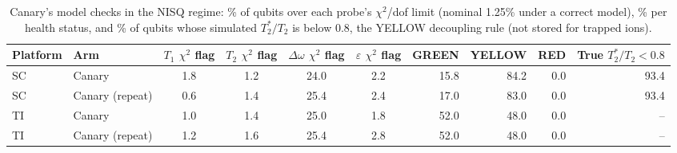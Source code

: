 \begin{table}[!t]
\centering
\footnotesize
\caption{Canary's model checks in the NISQ regime: \% of qubits over each probe's $\chi^2$/dof limit (nominal 1.25\% under a correct model), \% per health status, and \% of qubits whose simulated $T_2^*/T_2$ is below 0.8, the YELLOW decoupling rule (not stored for trapped ions).}
\label{tab:s4}
\begin{adjustbox}{max width=\linewidth}
\begin{tabular}{llccccrrrr}
\hline
Platform & Arm & $T_1$ $\chi^2$ flag & $T_2$ $\chi^2$ flag & $\Delta\omega$ $\chi^2$ flag & $\varepsilon$ $\chi^2$ flag & GREEN & YELLOW & RED & True $T_2^*/T_2 < 0.8$ \\
\hline
SC & Canary & 1.8 & 1.2 & 24.0 & 2.2 & 15.8 & 84.2 & 0.0 & 93.4 \\
SC & Canary (repeat) & 0.6 & 1.4 & 25.4 & 2.4 & 17.0 & 83.0 & 0.0 & 93.4 \\
TI & Canary & 1.0 & 1.4 & 25.0 & 1.8 & 52.0 & 48.0 & 0.0 & -- \\
TI & Canary (repeat) & 1.2 & 1.6 & 25.4 & 2.8 & 52.0 & 48.0 & 0.0 & -- \\
\hline
\end{tabular}
\end{adjustbox}
\end{table}

